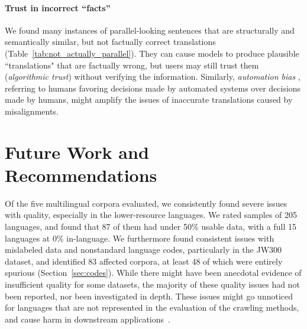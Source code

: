 \paragraph{Trust in incorrect ``facts''} %
We found many instances of parallel-looking sentences that are structurally and semantically similar, but not factually correct translations (Table~\ref{tab:not_actually_parallel}). They can cause models to produce plausible ``translations" that are factually wrong, but users may still trust them (\textit{algorithmic trust}) without verifying the information. %
Similarly, \textit{automation bias} \citep{skitka-etal-1999-does},
referring to humans favoring decisions made by automated systems over decisions made by humans, might amplify the issues of inaccurate translations caused by misalignments.

\section{Future Work and Recommendations}\label{sec:recommendation}
Of the five multilingual corpora evaluated, we consistently found severe issues with quality, especially in the lower-resource languages. We rated samples of 205 languages, and found that 87 of them had under 50\% usable data, with a full 15 languages at 0\% in-language. We furthermore found consistent issues with mislabeled data and nonstandard language codes, particularly in the JW300 dataset, and identified 83 affected corpora, at least 48 of which were entirely spurious (Section~\ref{sec:codes}). While there might have been anecdotal evidence of insufficient quality for some datasets, the majority of these quality issues had not been reported, nor been investigated in depth. These issues might go unnoticed for languages that are not represented in the evaluation of the crawling methods, and cause harm in downstream applications~\citep{khayrallah-koehn-2018-impact}.

